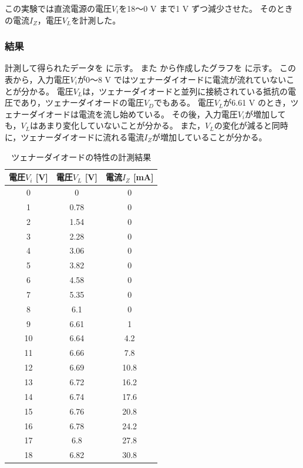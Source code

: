   この実験では直流電源の電圧$V_i$を18～0 V まで1 V ずつ減少させた。
  そのときの電流$I_Z$，電圧$V_L$を計測した。

\subsubsection{結果}
	計測して得られたデータを に示す。
	また から作成したグラフを に示す。
	この表から，入力電圧$V_i$が0～8 V ではツェナーダイオードに電流が流れていないことが分かる。
	電圧$V_L$は，ツェナーダイオードと並列に接続されている抵抗の電圧であり，ツェナーダイオードの電圧$V_D$でもある。
	電圧$V_L$が6.61 V のとき，ツェナーダイオードは電流を流し始めている。
	その後，入力電圧$V_i$が増加しても，$V_L$はあまり変化していないことが分かる。
	また，$V_L$の変化が減ると同時に，ツェナーダイオードに流れる電流$I_Z$が増加していることが分かる。

	\begin{table}[hbt]
		\centering
		\caption{ツェナーダイオードの特性の計測結果}
		\begin{tabular}{|c|c|c|}
		\hline
		電圧$V_i$ [V] & 電圧$V_L$ [V] & 電流$I_Z$ [mA] 			 \\ \hline
		0            & 0            & 0             \\ \hline
		1            & 0.78         & 0             \\ \hline
		2            & 1.54         & 0             \\ \hline
		3            & 2.28         & 0             \\ \hline
		4            & 3.06         & 0             \\ \hline
		5            & 3.82         & 0             \\ \hline
		6            & 4.58         & 0             \\ \hline
		7            & 5.35         & 0             \\ \hline
		8            & 6.1          & 0             \\ \hline
		9            & 6.61         & 1             \\ \hline
		10           & 6.64         & 4.2           \\ \hline
		11           & 6.66         & 7.8           \\ \hline
		12           & 6.69         & 10.8          \\ \hline
		13           & 6.72         & 16.2          \\ \hline
		14           & 6.74         & 17.6          \\ \hline
		15           & 6.76         & 20.8          \\ \hline
		16           & 6.78         & 24.2          \\ \hline
		17           & 6.8          & 27.8          \\ \hline
		18           & 6.82         & 30.8          \\ \hline
		\end{tabular}
		\label{tab:zenerDiode1_result}
	\end{table}

